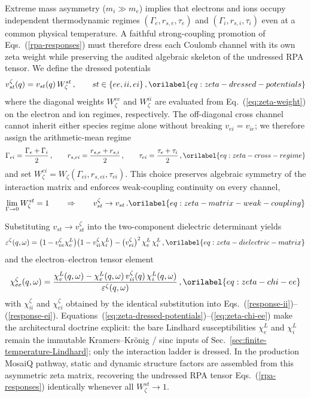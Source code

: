 \documentclass[aps,showkeys,noshowpacs,superscriptaddress,pre,preprint]{revtex4-2}
\let\label\orilabel
\begin{document}
Extreme mass asymmetry ($m_i\gg m_e$) implies that electrons and ions occupy
independent thermodynamic regimes $(\Gamma_e,r_{s,e},\tau_e)$ and
$(\Gamma_i,r_{s,i},\tau_i)$ even at a common physical temperature.
A faithful strong-coupling promotion of Eqs.~(\ref{rpa-responses}) must therefore
dress each Coulomb channel with its own zeta weight while preserving the audited
algebraic skeleton of the undressed RPA tensor.
We define the dressed potentials
\begin{equation}
v_{st}^{\zeta}(q)
=
v_{st}(q)\,W_\zeta^{st}\,,
\qquad
st\in\{ee,ii,ei\}\,,
\label{eq:zeta-dressed-potentials}
\end{equation}
where the diagonal weights $W_\zeta^{ee}$ and $W_\zeta^{ii}$ are evaluated from
Eq.~(\ref{eq:zeta-weight}) on the electron and ion regimes, respectively.
The off-diagonal cross channel cannot inherit either species regime alone without
breaking $v_{ei}=v_{ie}$; we therefore assign the arithmetic-mean regime
\begin{equation}
\Gamma_{ei}
=
\frac{\Gamma_e+\Gamma_i}{2}\,,
\qquad
r_{s,ei}
=
\frac{r_{s,e}+r_{s,i}}{2}\,,
\qquad
\tau_{ei}
=
\frac{\tau_e+\tau_i}{2}\,,
\label{eq:zeta-cross-regime}
\end{equation}
and set $W_\zeta^{ei}=W_\zeta(\Gamma_{ei},r_{s,ei},\tau_{ei})$.
This choice preserves algebraic symmetry of the interaction matrix and enforces
weak-coupling continuity on every channel,
\begin{equation}
\lim_{\Gamma\to 0} W_\zeta^{st}=1
\qquad\Rightarrow\qquad
v_{st}^{\zeta}\to v_{st}\,.
\label{eq:zeta-matrix-weak-coupling}
\end{equation}

Substituting $v_{st}\to v_{st}^{\zeta}$ into the two-component dielectric determinant
yields
\begin{equation}
\varepsilon^{\zeta}(q,\omega)
=
\bigl(1 - v_{ee}^{\zeta}\chi_e^L\bigr)
\bigl(1 - v_{ii}^{\zeta}\chi_i^L\bigr)
-
\bigl(v_{ei}^{\zeta}\bigr)^2\,\chi_e^L\,\chi_i^L\,,
\label{eq:zeta-dielectric-matrix}
\end{equation}
and the electron--electron tensor element
\begin{equation}
\chi_{ee}^{\zeta}(q,\omega)
=
\frac{
\chi_e^L(q,\omega)
-
\chi_e^L(q,\omega)\,v_{ii}^{\zeta}(q)\,\chi_i^L(q,\omega)
}{\varepsilon^{\zeta}(q,\omega)}\,,
\label{eq:zeta-chi-ee}
\end{equation}
with $\chi_{ii}^{\zeta}$ and $\chi_{ei}^{\zeta}$ obtained by the identical substitution
into Eqs.~(\ref{response-ii})--(\ref{response-ei}).
Equations~(\ref{eq:zeta-dressed-potentials})--(\ref{eq:zeta-chi-ee}) make the
architectural doctrine explicit:
the bare Lindhard susceptibilities $\chi_e^L$ and $\chi_i^L$ remain the immutable
Kramers--Kr\"onig / sinc inputs of Sec.~\ref{sec:finite-temperature-Lindhard};
only the interaction ladder is dressed.
In the production MosaiQ pathway, static and dynamic structure factors are assembled
from this asymmetric zeta matrix, recovering the undressed RPA tensor
Eqs.~(\ref{rpa-responses}) identically whenever all $W_\zeta^{st}\to 1$.
\end{document}
